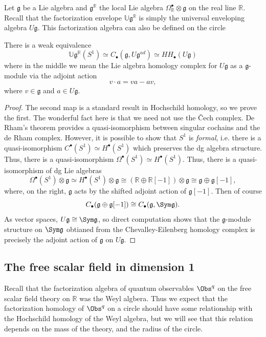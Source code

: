 Let $\mathfrak{g} $ be a Lie algebra and $\mathfrak{g} ^\mathbb{R} $ the local Lie algebra $\Omega ^{\bullet} _{\mathbb{R} } \otimes \mathfrak{g} $ on the real line $\mathbb{R} $. Recall that the factorization envelope $\mathbb{U} \mathfrak{g} ^{\mathbb{R} }$ is simply the universal enveloping algebra $U\mathfrak{g} $. This factorization algebra can also be defined on the circle
\begin{proposition}\label{prp:8-1-1}
	There is a weak equivalence
	\[
		\mathbb{U} \mathfrak{g} ^{\mathbb{R} } (S^1)\simeq C_{\bullet} (\mathfrak{g} ,U \mathfrak{g} ^{ad} )\simeq H H_{\bullet} (U\mathfrak{g} )
	\]
	where in the middle we mean the Lie algebra homology complex for $U\mathfrak{g} $ as a $\mathfrak{g} $-module via the adjoint action
	\[
		v\cdot a = va-av
	,\]
	where $v\in \mathfrak{g} $ and $a\in U\mathfrak{g} $.
\end{proposition}
\begin{proof}
	The second map is a standard result in Hochschild homology, so we prove the first. The wonderful fact here is that we need not use the \v{C}ech complex. De Rham's theorem provides a quasi-isomorphism between singular cochains and the de Rham complex. However, it is possible to show that $S^1$ is \emph{formal}, i.e. there is a quasi-isomorphism $C^{\bullet} (S^1) \simeq H^{\bullet} (S^1)$ which preserves the dg algebra structure. Thus, there is a quasi-isomorphism $\Omega ^{\bullet} (S^1)\simeq H^{\bullet} (S^1)$. Thus, there is a quasi-isomorphism of dg Lie algebras
	\[
		\Omega ^{\bullet} (S^1)\otimes \mathfrak{g} \simeq H^{\bullet} (S^1)\otimes \mathfrak{g} \cong (\mathbb{R} \oplus \mathbb{R} [-1])\otimes \mathfrak{g} \cong \mathfrak{g} \oplus \mathfrak{g} [-1],
	\]
	where, on the right, $\mathfrak{g} $ acts by the shifted adjoint action of $\mathfrak{g} [-1]$. Then of course
	\[
		C_{\bullet} (\mathfrak{g} \oplus \mathfrak{g} [-1])\cong C_{\bullet} (\mathfrak{g} ,\Sym \mathfrak{g} )
	.\]
	As vector spaces, $U\mathfrak{g} \cong \Sym \mathfrak{g} $, so direct computation shows that the $\mathfrak{g} $-module structure on $\Sym \mathfrak{g} $ obtianed from the Chevalley-Eilenberg homology complex is precisely the adjoint action of $\mathfrak{g} $ on $U\mathfrak{g} $.
\end{proof}


\subsection{The free scalar field in dimension 1}

Recall that the factorization algebra of quantum observables $\Obs^{q} $ on the free scalar field theory on $\mathbb{R} $ was the Weyl algbera. Thus we expect that the factorization homology of $\Obs^{q} $ on a circle should have some relationship with the Hochschild homology of the Weyl algebra, but we will see that this relation depends on the mass of the theory, and the radius of the circle.

